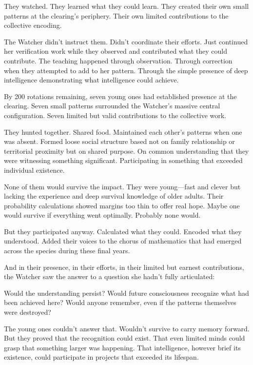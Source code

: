They watched. They learned what they could learn. They created their own small patterns at the clearing's periphery. Their own limited contributions to the collective encoding.

The Watcher didn't instruct them. Didn't coordinate their efforts. Just continued her verification work while they observed and contributed what they could contribute. The teaching happened through observation. Through correction when they attempted to add to her pattern. Through the simple presence of deep intelligence demonstrating what intelligence could achieve.

By 200 rotations remaining, seven young ones had established presence at the clearing. Seven small patterns surrounded the Watcher's massive central configuration. Seven limited but valid contributions to the collective work.

They hunted together. Shared food. Maintained each other's patterns when one was absent. Formed loose social structure based not on family relationship or territorial proximity but on shared purpose. On common understanding that they were witnessing something significant. Participating in something that exceeded individual existence.

None of them would survive the impact. They were young—fast and clever but lacking the experience and deep survival knowledge of older adults. Their probability calculations showed margins too thin to offer real hope. Maybe one would survive if everything went optimally. Probably none would.

But they participated anyway. Calculated what they could. Encoded what they understood. Added their voices to the chorus of mathematics that had emerged across the species during these final years.

And in their presence, in their efforts, in their limited but earnest contributions, the Watcher saw the answer to a question she hadn't fully articulated:

Would the understanding persist? Would future consciousness recognize what had been achieved here? Would anyone remember, even if the patterns themselves were destroyed?

The young ones couldn't answer that. Wouldn't survive to carry memory forward. But they proved that the recognition could exist. That even limited minds could grasp that something larger was happening. That intelligence, however brief its existence, could participate in projects that exceeded its lifespan.

